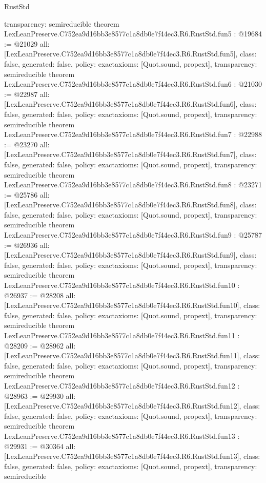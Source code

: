 \begin{lexlean}{RustStd}
\begin{coremodule}
{  transparency: semireducible
}
theorem LexLeanPreserve.C752ea9d16bb3e8577c1a8db0e7f44ec3.R6.RustStd.fun5 : @19684 := @21029 {
  all: [LexLeanPreserve.C752ea9d16bb3e8577c1a8db0e7f44ec3.R6.RustStd.fun5],
  class: false,
  generated: false,
  policy: exact{axioms: [Quot.sound, propext]},
  transparency: semireducible
}
theorem LexLeanPreserve.C752ea9d16bb3e8577c1a8db0e7f44ec3.R6.RustStd.fun6 : @21030 := @22987 {
  all: [LexLeanPreserve.C752ea9d16bb3e8577c1a8db0e7f44ec3.R6.RustStd.fun6],
  class: false,
  generated: false,
  policy: exact{axioms: [Quot.sound, propext]},
  transparency: semireducible
}
theorem LexLeanPreserve.C752ea9d16bb3e8577c1a8db0e7f44ec3.R6.RustStd.fun7 : @22988 := @23270 {
  all: [LexLeanPreserve.C752ea9d16bb3e8577c1a8db0e7f44ec3.R6.RustStd.fun7],
  class: false,
  generated: false,
  policy: exact{axioms: [Quot.sound, propext]},
  transparency: semireducible
}
theorem LexLeanPreserve.C752ea9d16bb3e8577c1a8db0e7f44ec3.R6.RustStd.fun8 : @23271 := @25786 {
  all: [LexLeanPreserve.C752ea9d16bb3e8577c1a8db0e7f44ec3.R6.RustStd.fun8],
  class: false,
  generated: false,
  policy: exact{axioms: [Quot.sound, propext]},
  transparency: semireducible
}
theorem LexLeanPreserve.C752ea9d16bb3e8577c1a8db0e7f44ec3.R6.RustStd.fun9 : @25787 := @26936 {
  all: [LexLeanPreserve.C752ea9d16bb3e8577c1a8db0e7f44ec3.R6.RustStd.fun9],
  class: false,
  generated: false,
  policy: exact{axioms: [Quot.sound, propext]},
  transparency: semireducible
}
theorem LexLeanPreserve.C752ea9d16bb3e8577c1a8db0e7f44ec3.R6.RustStd.fun10 : @26937 := @28208 {
  all: [LexLeanPreserve.C752ea9d16bb3e8577c1a8db0e7f44ec3.R6.RustStd.fun10],
  class: false,
  generated: false,
  policy: exact{axioms: [Quot.sound, propext]},
  transparency: semireducible
}
theorem LexLeanPreserve.C752ea9d16bb3e8577c1a8db0e7f44ec3.R6.RustStd.fun11 : @28209 := @28962 {
  all: [LexLeanPreserve.C752ea9d16bb3e8577c1a8db0e7f44ec3.R6.RustStd.fun11],
  class: false,
  generated: false,
  policy: exact{axioms: [Quot.sound, propext]},
  transparency: semireducible
}
theorem LexLeanPreserve.C752ea9d16bb3e8577c1a8db0e7f44ec3.R6.RustStd.fun12 : @28963 := @29930 {
  all: [LexLeanPreserve.C752ea9d16bb3e8577c1a8db0e7f44ec3.R6.RustStd.fun12],
  class: false,
  generated: false,
  policy: exact{axioms: [Quot.sound, propext]},
  transparency: semireducible
}
theorem LexLeanPreserve.C752ea9d16bb3e8577c1a8db0e7f44ec3.R6.RustStd.fun13 : @29931 := @30364 {
  all: [LexLeanPreserve.C752ea9d16bb3e8577c1a8db0e7f44ec3.R6.RustStd.fun13],
  class: false,
  generated: false,
  policy: exact{axioms: [Quot.sound, propext]},
  transparency: semireducible
}
\end{coremodule}
\end{lexlean}
